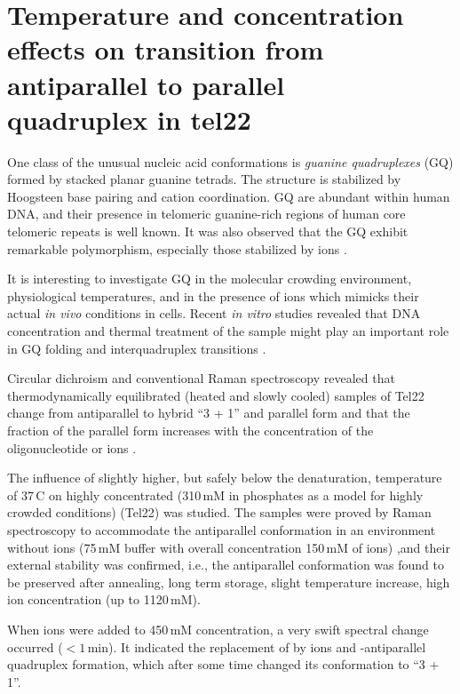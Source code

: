 \section[%
	Temperature and concentration effects on transition from antiparallel	to
	parallel quadruplex in tel22
]{%
	Temperature and concentration effects on transition from antiparallel to
	parallel\\quadruplex in tel22
}

One class of the unusual nucleic acid conformations is
\emph{guanine quadruplexes} (GQ)
formed by stacked planar guanine tetrads.
The structure is stabilized by Hoogsteen base pairing and cation coordination.
GQ are abundant within human DNA, and their presence in telomeric guanine-rich
regions of human core telomeric repeats  is well known.
It was also observed that the GQ exhibit remarkable polymorphism, especially
those stabilized by  ions
\parencite{Chaires2013}.

It is interesting to investigate GQ in the molecular crowding environment,
physiological temperatures, and in the presence of  ions which mimicks
their actual \emph{in vivo} conditions in cells.
Recent \emph{in vitro} studies revealed that DNA concentration and thermal
treatment
of the sample might play an important role in GQ folding and interquadruplex
transitions
\parencite{Palacky2013}.

Circular dichroism and conventional Raman spectroscopy revealed that
thermodynamically equilibrated (heated and slowly cooled) samples of Tel22
change from antiparallel to hybrid “3 + 1” and parallel form and that
the fraction of the parallel form increases with the concentration of the
oligonucleotide or  ions
\parencite{Palacky2013}.

The influence of slightly higher, but safely below the denaturation,
temperature of 37\,\textdegree{}C on highly concentrated (310\,mM
in phosphates as a model for highly crowded conditions) 
(Tel22) was studied.
The samples were proved by Raman spectroscopy to accommodate the antiparallel
conformation in an environment without  ions (75\,mM 
buffer with overall concentration 150\,mM of  ions) ,and their
external
stability was confirmed, i.e., the antiparallel conformation was found to be
preserved after annealing, long term storage, slight temperature increase, high
 ion concentration (up to 1120\,mM).

When  ions were added to 450\,mM concentration, a very swift spectral
change occurred ($< 1$\,min). It indicated the replacement of  by
 ions and -antiparallel quadruplex formation, which after
some time changed its conformation to “3 + 1”.

